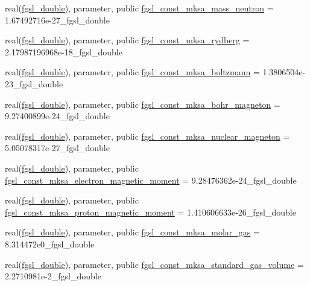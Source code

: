 \begin{DoxyCompactItemize}
\item 
real(\hyperlink{namespacefgsl_a9af5113378e0f000eb479d3f90196ddf}{fgsl\+\_\+double}), parameter, public \hyperlink{namespacefgsl_a4480f5ff7a83600820b4cdaa8aff929e}{fgsl\+\_\+const\+\_\+mksa\+\_\+mass\+\_\+neutron} = 1.\+67492716e-\/27\+\_\+fgsl\+\_\+double
\item 
real(\hyperlink{namespacefgsl_a9af5113378e0f000eb479d3f90196ddf}{fgsl\+\_\+double}), parameter, public \hyperlink{namespacefgsl_a06f564b1101469e9756b3bb20be06b16}{fgsl\+\_\+const\+\_\+mksa\+\_\+rydberg} = 2.\+17987196968e-\/18\+\_\+fgsl\+\_\+double
\item 
real(\hyperlink{namespacefgsl_a9af5113378e0f000eb479d3f90196ddf}{fgsl\+\_\+double}), parameter, public \hyperlink{namespacefgsl_aee3fe8b4260b1d34436e9f66707b773e}{fgsl\+\_\+const\+\_\+mksa\+\_\+boltzmann} = 1.\+3806504e-\/23\+\_\+fgsl\+\_\+double
\item 
real(\hyperlink{namespacefgsl_a9af5113378e0f000eb479d3f90196ddf}{fgsl\+\_\+double}), parameter, public \hyperlink{namespacefgsl_afa92cd1a7ffe8a0106c3ae29720b0f84}{fgsl\+\_\+const\+\_\+mksa\+\_\+bohr\+\_\+magneton} = 9.\+27400899e-\/24\+\_\+fgsl\+\_\+double
\item 
real(\hyperlink{namespacefgsl_a9af5113378e0f000eb479d3f90196ddf}{fgsl\+\_\+double}), parameter, public \hyperlink{namespacefgsl_a01a0e11a78d0097f8c8a170dbea03e3f}{fgsl\+\_\+const\+\_\+mksa\+\_\+nuclear\+\_\+magneton} = 5.\+05078317e-\/27\+\_\+fgsl\+\_\+double
\item 
real(\hyperlink{namespacefgsl_a9af5113378e0f000eb479d3f90196ddf}{fgsl\+\_\+double}), parameter, public \hyperlink{namespacefgsl_ae360dd0b55b309065855f8521a316e0f}{fgsl\+\_\+const\+\_\+mksa\+\_\+electron\+\_\+magnetic\+\_\+moment} = 9.\+28476362e-\/24\+\_\+fgsl\+\_\+double
\item 
real(\hyperlink{namespacefgsl_a9af5113378e0f000eb479d3f90196ddf}{fgsl\+\_\+double}), parameter, public \hyperlink{namespacefgsl_a11b01d727e4e01028200e21ced0e16c2}{fgsl\+\_\+const\+\_\+mksa\+\_\+proton\+\_\+magnetic\+\_\+moment} = 1.\+410606633e-\/26\+\_\+fgsl\+\_\+double
\item 
real(\hyperlink{namespacefgsl_a9af5113378e0f000eb479d3f90196ddf}{fgsl\+\_\+double}), parameter, public \hyperlink{namespacefgsl_aba418557adafd1575eab5108ba172cf7}{fgsl\+\_\+const\+\_\+mksa\+\_\+molar\+\_\+gas} = 8.\+314472e0\+\_\+fgsl\+\_\+double
\item 
real(\hyperlink{namespacefgsl_a9af5113378e0f000eb479d3f90196ddf}{fgsl\+\_\+double}), parameter, public \hyperlink{namespacefgsl_a43547e219346197d5b5b8c6adff614eb}{fgsl\+\_\+const\+\_\+mksa\+\_\+standard\+\_\+gas\+\_\+volume} = 2.\+2710981e-\/2\+\_\+fgsl\+\_\+double

\end{DoxyCompactItemize}
